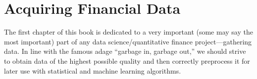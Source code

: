 \chapter{Acquiring Financial Data\label{Acquiring Financial Data}}
The first chapter of this book is dedicated to a very important (some may say the most important) part of any data science/quantitative finance project—gathering data. In line with the famous adage “garbage in, garbage out,” we should strive to obtain data of the highest possible quality and then correctly preprocess it for later use with statistical and machine learning algorithms.

